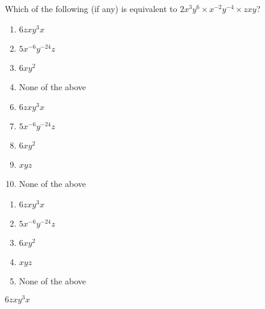 


 Which of the following (if any) is equivalent to $2x^3y^6 \times x^{-2}y^{-4} \times zxy$?


\ifsat
	\begin{enumerate}[label=\Alph*)]
		\item   $6zxy^3x$%
		\item  $5x^{-6}y^{-24}z$ 
		\item  $6xy^2$ 
		\item   None of the above
	\end{enumerate}
\else
\fi

\ifacteven
	\begin{enumerate}[label=\textbf{\Alph*.},itemsep=\fill,align=left]
		\setcounter{enumii}{5}
		\item   $6zxy^3x$%
		\item  $5x^{-6}y^{-24}z$ 
		\item  $6xy^2$ 
		\addtocounter{enumii}{1}
		\item  $xyz$
		\item   None of the above
	\end{enumerate}
\else
\fi

\ifactodd
	\begin{enumerate}[label=\textbf{\Alph*.},itemsep=\fill,align=left]
		\item   $6zxy^3x$%
		\item  $5x^{-6}y^{-24}z$ 
		\item  $6xy^2$ 
		\item  $xyz$
		\item   None of the above
	\end{enumerate}
\else
\fi

\ifgridin
   $6zxy^3x$%
		
\else
\fi

